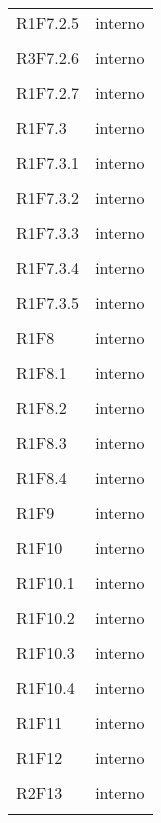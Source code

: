 \documentclass[a4paper]{article}
\begin{document}
\begin{longtable}{ >{\centering}p{}
		>{\centering}p{}}
	R1F7.2.5 & interno\\\tabularnewline
	
	R3F7.2.6 & interno\\\tabularnewline
	
	R1F7.2.7 & interno\\\tabularnewline
	
	R1F7.3 & interno\\\tabularnewline
	
	R1F7.3.1 & interno\\\tabularnewline
	
	R1F7.3.2 & interno\\\tabularnewline
	
	R1F7.3.3 & interno\\\tabularnewline
	
	R1F7.3.4 & interno\\\tabularnewline
	
	R1F7.3.5 & interno\\\tabularnewline
	
	R1F8 & interno\\\tabularnewline
	
	R1F8.1 & interno\\\tabularnewline
	
	R1F8.2 & interno\\\tabularnewline
	
	R1F8.3 & interno\\\tabularnewline
	
	R1F8.4 & interno\\\tabularnewline
	
	R1F9 & interno\\\tabularnewline
	
	R1F10 & interno\\\tabularnewline
	
	R1F10.1 & interno\\\tabularnewline
	
	R1F10.2 & interno\\\tabularnewline
	
	R1F10.3 & interno\\\tabularnewline
	
	R1F10.4 & interno\\\tabularnewline
	
	R1F11 & interno\\\tabularnewline
	
	R1F12 & interno\\\tabularnewline
	
	R2F13 & interno\\\tabularnewline
	

\end{longtable}
\end{document}
